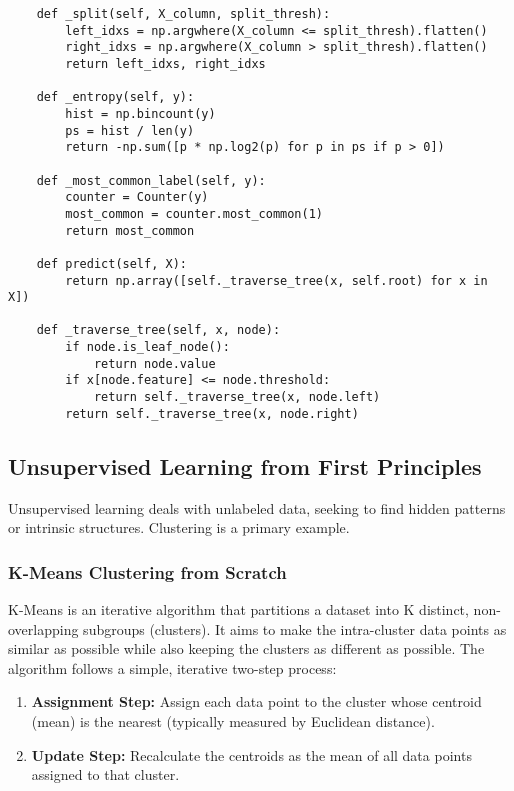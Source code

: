 \documentclass[11pt,a4paper]{article}
\begin{document}
\begin{lstlisting}
    def _split(self, X_column, split_thresh):
        left_idxs = np.argwhere(X_column <= split_thresh).flatten()
        right_idxs = np.argwhere(X_column > split_thresh).flatten()
        return left_idxs, right_idxs

    def _entropy(self, y):
        hist = np.bincount(y)
        ps = hist / len(y)
        return -np.sum([p * np.log2(p) for p in ps if p > 0])

    def _most_common_label(self, y):
        counter = Counter(y)
        most_common = counter.most_common(1)
        return most_common

    def predict(self, X):
        return np.array([self._traverse_tree(x, self.root) for x in X])

    def _traverse_tree(self, x, node):
        if node.is_leaf_node():
            return node.value
        if x[node.feature] <= node.threshold:
            return self._traverse_tree(x, node.left)
        return self._traverse_tree(x, node.right)
\end{lstlisting}

\subsection{Unsupervised Learning from First Principles}

Unsupervised learning deals with unlabeled data, seeking to find hidden patterns or intrinsic structures. Clustering is a primary example.

\subsubsection{K-Means Clustering from Scratch}

K-Means is an iterative algorithm that partitions a dataset into K distinct, non-overlapping subgroups (clusters). It aims to make the intra-cluster data points as similar as possible while also keeping the clusters as different as possible. The algorithm follows a simple, iterative two-step process:

\begin{enumerate}
    \item \textbf{Assignment Step:} Assign each data point to the cluster whose centroid (mean) is the nearest (typically measured by Euclidean distance).
    \item \textbf{Update Step:} Recalculate the centroids as the mean of all data points assigned to that cluster.
\end{enumerate}
\end{document}
